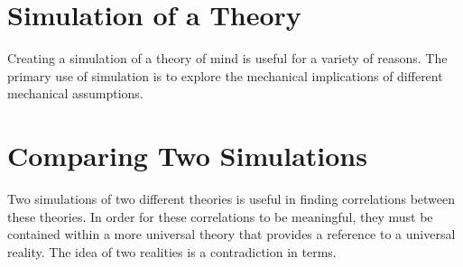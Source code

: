 \section{Simulation of a Theory}

Creating a simulation of a theory of mind is useful for a variety of
reasons.  The primary use of simulation is to explore the mechanical
implications of different mechanical assumptions.

\section{Comparing Two Simulations}

Two simulations of two different theories is useful in finding
correlations between these theories.  In order for these correlations
to be meaningful, they must be contained within a more universal
theory that provides a reference to a universal reality.  The idea of
two realities is a contradiction in terms.

